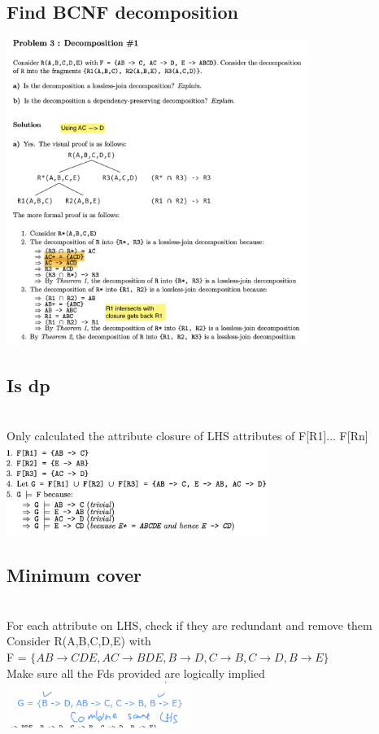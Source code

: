 \documentclass[11pt]{article}
\begin{document}
\begin{multicols*}{3}
\subsection*{Find BCNF decomposition}
\includegraphics[height=10cm]{images/b8}
\subsection*{Is dp}\\
Only calculated the attribute closure of LHS attributes of F[R1]... F[Rn]\\
\includegraphics[height=3cm]{images/b9}
\subsection*{Minimum cover}\\
For each attribute on LHS, check if they are redundant and remove them\\
Consider R(A,B,C,D,E) with \\F = $\{AB \rightarrow CDE, AC  \rightarrow BDE, B  \rightarrow D, C  \rightarrow B, C  \rightarrow D, B  \rightarrow E\}$\\
Make sure all the Fds provided are logically implied
\includegraphics[height=1.5cm]{images/b11}

\end{multicols*}
\end{document}
